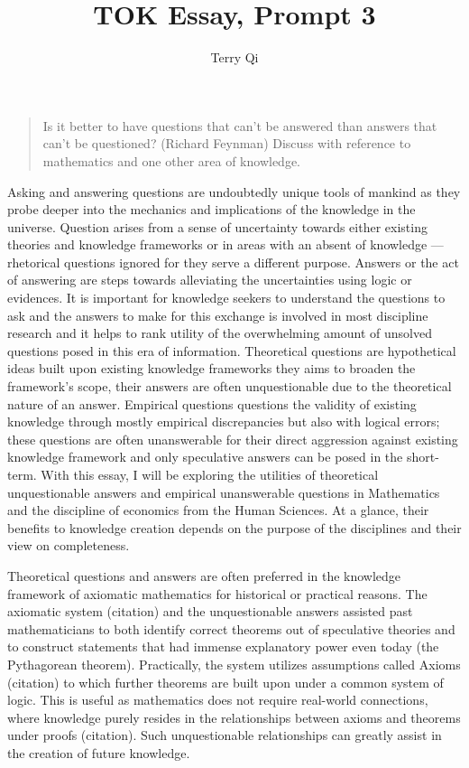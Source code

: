 \documentclass[a4paper,12pt]{article}
\title{\vspace{-8ex}TOK Essay, Prompt 3}
\author{Terry Qi}
\date{}
\begin{document}
\maketitle
\begin{quote}
    Is it better to have questions that can't be answered than answers that can't be questioned? (Richard Feynman) Discuss with reference to mathematics and one other area of knowledge.
\end{quote}


Asking and answering questions are undoubtedly unique tools of mankind as they probe deeper into the mechanics and implications of the knowledge in the universe. Question arises from a sense of uncertainty towards either existing theories and knowledge frameworks or in areas with an absent of knowledge --- rhetorical questions ignored for they serve a different purpose. Answers or the act of answering are steps towards alleviating the uncertainties using logic or evidences. It is important for knowledge seekers to understand the questions to ask and the answers to make for this exchange is involved in most discipline research and it helps to rank utility of the overwhelming amount of unsolved questions posed in this era of information. Theoretical questions are hypothetical ideas built upon existing knowledge frameworks they aims to broaden the framework's scope, their answers are often unquestionable due to the theoretical nature of an answer. Empirical questions questions the validity of existing knowledge through mostly empirical discrepancies but also with logical errors; these questions are often unanswerable for their direct aggression against existing knowledge framework and only speculative answers can be posed in the short-term. With this essay, I will be exploring the utilities of theoretical unquestionable answers and empirical unanswerable questions in Mathematics and the discipline of economics from the Human Sciences. At a glance, their benefits to knowledge creation depends on the purpose of the disciplines and their view on completeness.


Theoretical questions and answers are often preferred in the knowledge framework of axiomatic mathematics for historical or practical reasons. The axiomatic system (citation) and the unquestionable answers assisted past mathematicians to both identify correct theorems out of speculative theories and to construct statements that had immense explanatory power even today (the Pythagorean theorem). Practically, the system utilizes assumptions called Axioms (citation) to which further theorems are built upon under a common system of logic. This is useful as mathematics does not require real-world connections, where knowledge purely resides in the relationships between axioms and theorems under proofs (citation). Such unquestionable relationships can greatly assist in the creation of future knowledge.
\end{document}
